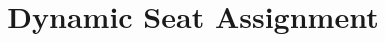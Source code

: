 \documentclass{article}
\title{Dynamic Seat Assignment}
\begin{document}
\maketitle{}











% 



% 




% 

% 

% 

% 
\end{document}
